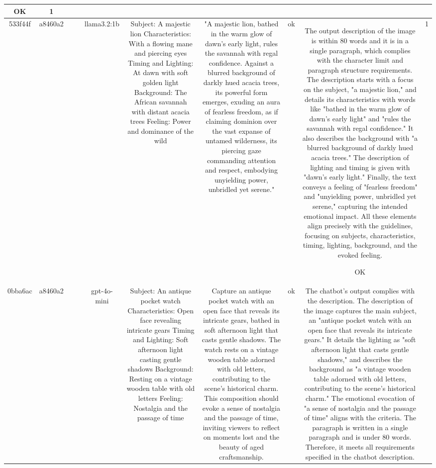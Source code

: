 \begin{table}[h!]
\begin{tabular}{|c|c|c|c|c|c|c|c|c|c|}
OK & 1\\
\hline
533f44f & a8460a2 &  &  & llama3.2:1b & Subject: A majestic lion  
Characteristics: With a flowing mane and piercing eyes  
Timing and Lighting: At dawn with soft golden light  
Background: The African savannah with distant acacia trees  
Feeling: Power and dominance of the wild & "A majestic lion, bathed in the warm glow of dawn's early light, rules the savannah with regal confidence. Against a blurred background of darkly hued acacia trees, its powerful form emerges, exuding an aura of fearless freedom, as if claiming dominion over the vast expanse of untamed wilderness, its piercing gaze commanding attention and respect, embodying unyielding power, unbridled yet serene." & ok & The output description of the image is within 80 words and it is in a single paragraph, which complies with the character limit and paragraph structure requirements. The description starts with a focus on the subject, "a majestic lion," and details its characteristics with words like "bathed in the warm glow of dawn's early light" and "rules the savannah with regal confidence." It also describes the background with "a blurred background of darkly hued acacia trees." The description of lighting and timing is given with "dawn's early light." Finally, the text conveys a feeling of "fearless freedom" and "unyielding power, unbridled yet serene," capturing the intended emotional impact. All these elements align precisely with the guidelines, focusing on subjects, characteristics, timing, lighting, background, and the evoked feeling.

OK & 1\\
\hline
0bba6ac & a8460a2 &  &  & gpt-4o-mini & Subject: An antique pocket watch  
Characteristics: Open face revealing intricate gears  
Timing and Lighting: Soft afternoon light casting gentle shadows  
Background: Resting on a vintage wooden table with old letters  
Feeling: Nostalgia and the passage of time & Capture an antique pocket watch with an open face that reveals its intricate gears, bathed in soft afternoon light that casts gentle shadows. The watch rests on a vintage wooden table adorned with old letters, contributing to the scene's historical charm. This composition should evoke a sense of nostalgia and the passage of time, inviting viewers to reflect on moments lost and the beauty of aged craftsmanship. & ok & The chatbot's output complies with the description. The description of the image captures the main subject, an "antique pocket watch with an open face that reveals its intricate gears." It details the lighting as "soft afternoon light that casts gentle shadows," and describes the background as "a vintage wooden table adorned with old letters, contributing to the scene's historical charm." The emotional evocation of "a sense of nostalgia and the passage of time" aligns with the criteria. The paragraph is written in a single paragraph and is under 80 words. Therefore, it meets all requirements specified in the chatbot description.


\end{tabular}
\end{table}
